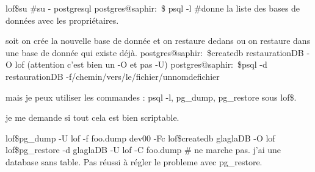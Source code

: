 \documentclass[12pt,a4paper]{article}
\begin{document}
lof\$su
#su - postgresql
postgres@saphir:~\$  psql -l #donne la liste des bases de données avec les propriétaires.

soit on crée la nouvelle base de donnée et on restaure dedans ou on restaure dans une base de donnée qui existe déjà.
postgres@saphir:~\$createdb restaurationDB -O lof (attention c'est bien un -O et pas -U)
postgres@saphir:~\$psql -d restaurationDB -f/chemin/vers/le/fichier/unnomdefichier

mais je peux utiliser les commandes : psql -l, pg_dump, pg_restore sous lof\$.

je me demande si tout cela est bien scriptable.

lof\$pg_dump -U lof -f foo.dump dev00 -Fc
lof\$createdb glaglaDB -O lof
lof\$pg_restore -d glaglaDB -U lof -C foo.dump # ne marche pas. j'ai une database sans table.
Pas réussi à régler le probleme avec pg_restore.
\end{document}
